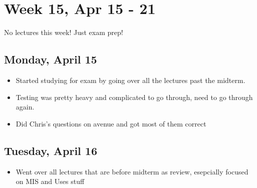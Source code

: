 \documentclass{article}
\begin{document}
\section{Week 15, Apr 15 - 21}

No lectures this week! Just exam prep!

\subsection{Monday, April 15}
\begin{itemize}
    \item Started studying for exam by going over all the lectures past the midterm.
    \item Testing was pretty heavy and complicated to go through, need to go through again.
    \item Did Chris's questions on avenue and got most of them correct
\end{itemize}

\subsection{Tuesday, April 16}
\begin{itemize}
    \item Went over all lectures that are before midterm as review, esepcially focused on MIS and Uses stuff
\end{itemize}
\end{document}
